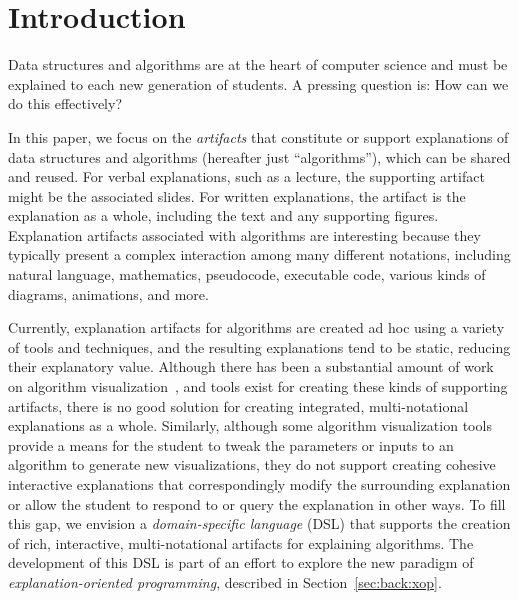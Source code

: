 \documentclass[sigconf]{acmart}
\begin{document}
\maketitle

\section{Introduction}
\label{sec:intro}

Data structures and algorithms are at the heart of computer science and must be
explained to each new generation of students. A pressing question is: How can we
do this effectively?

In this paper, we focus on the \emph{artifacts} that constitute or support
explanations of data structures and algorithms (hereafter just ``algorithms''),
which can be shared and reused.
%
For verbal explanations, such as a lecture, the supporting artifact might be
the associated slides. For written explanations, the artifact is the
explanation as a whole, including the text and any supporting figures.
%
Explanation artifacts associated with algorithms are interesting because they
typically present a complex interaction among many different notations,
including natural language, mathematics, pseudocode, executable code, various
kinds of diagrams, animations, and more.


Currently, explanation artifacts for algorithms are created ad hoc using a
variety of tools and techniques, and the resulting explanations tend to be
static, reducing their explanatory value.
%
Although there has been a substantial amount of work on algorithm
visualization~\cite{Gloor92,Gloor97,HDS02,shaffer2010algorithm,HANSEN2002291,KANN1997223},
and tools exist for creating these kinds of supporting artifacts, there is no
good solution for creating integrated, multi-notational explanations as a
whole. Similarly, although some algorithm visualization tools provide a means
for the student to tweak the parameters or inputs to an algorithm to generate
new visualizations, they do not support creating cohesive interactive
explanations that correspondingly modify the surrounding explanation or
allow the student to respond to or query the explanation in other ways.
%
To fill this gap, we envision a \emph{domain-specific language} (DSL) that
supports the creation of rich, interactive, multi-notational artifacts for
explaining algorithms.
%
The development of this DSL is part of an effort to explore the new paradigm of
\emph{explanation-oriented programming}, described in
Section~\ref{sec:back:xop}.
\end{document}
